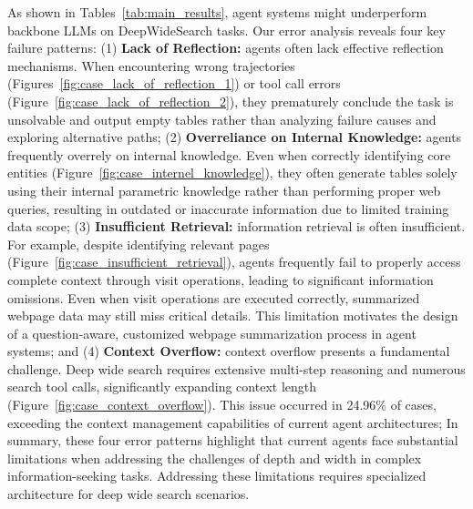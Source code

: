 \documentclass[11pt, letterpaper, logo, onecolumn, copyright, numbering]{paper_improved}
\begin{document}
As shown in Tables~\ref{tab:main_results}, agent systems might underperform backbone LLMs on DeepWideSearch tasks. Our error analysis reveals four key failure patterns:
(1) \textbf{Lack of Reflection:} agents often lack effective reflection mechanisms. When encountering wrong trajectories (Figures~\ref{fig:case_lack_of_reflection_1}) or tool call errors (Figure~\ref{fig:case_lack_of_reflection_2}), they prematurely conclude the task is unsolvable and output empty tables rather than analyzing failure causes and exploring alternative paths;
(2) \textbf{Overreliance on Internal Knowledge:} agents frequently overrely on internal knowledge. Even when correctly identifying core entities (Figure~\ref{fig:case_internel_knowledge}), they often generate tables solely using their internal parametric knowledge rather than performing proper web queries, resulting in outdated or inaccurate information due to limited training data scope;
(3) \textbf{Insufficient Retrieval:} information retrieval is often insufficient. For example, despite identifying relevant pages (Figure~\ref{fig:case_insufficient_retrieval}), agents frequently fail to properly access complete context through visit operations, leading to significant information omissions. Even when visit operations are executed correctly, summarized webpage data may still miss critical details. This limitation motivates the design of a question-aware, customized webpage summarization process in agent systems;
and (4) \textbf{Context Overflow:} context overflow presents a fundamental challenge. Deep wide search requires extensive multi-step reasoning and numerous search tool calls, significantly expanding context length (Figure~\ref{fig:case_context_overflow}). This issue occurred in 24.96\% of cases, exceeding the context management capabilities of current agent architectures;
In summary, these four error patterns highlight that current agents face substantial limitations when addressing the challenges of depth and width in complex information-seeking tasks. Addressing these limitations requires specialized architecture for deep wide search scenarios.





\end{document}

